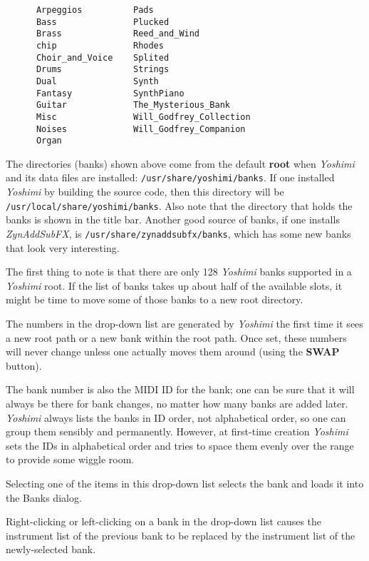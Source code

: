    \begin{verbatim}
      Arpeggios          Pads
      Bass               Plucked
      Brass              Reed_and_Wind
      chip               Rhodes
      Choir_and_Voice    Splited
      Drums              Strings
      Dual               Synth
      Fantasy            SynthPiano
      Guitar             The_Mysterious_Bank
      Misc               Will_Godfrey_Collection
      Noises             Will_Godfrey_Companion
      Organ              
   \end{verbatim}

   The directories (banks) shown above come from the default \textbf{root}
   when \textsl{Yoshimi} and its data files are installed:
   \texttt{/usr/share/yoshimi/banks}.
   If one installed \textsl{Yoshimi} by building the source code, then
   this directory will be
   \texttt{/usr/local/share/yoshimi/banks}.
   Also note that the directory that holds the banks is shown in the title bar.
   Another good source of banks, if one installs \textsl{ZynAddSubFX},
   is \texttt{/usr/share/zynaddsubfx/banks}, which has some new banks that look
   very interesting.

   The first thing to note is that there are only 128 \textsl{Yoshimi} banks
   supported in a \textsl{Yoshimi} root.
   If the list of banks takes up about
   half of the available slots, it might be time to move some of those banks to
   a new root directory.

   The numbers in the drop-down list are generated by \textsl{Yoshimi} the
   first time it sees a new root path or a new bank within the root path.
   Once set, these numbers will never change unless one actually moves them
   around (using the \textbf{SWAP} button).

   The bank number is also the MIDI ID for the bank;
   one can be sure that it will always
   be there for bank changes, no matter how many banks are added later.
   \textsl{Yoshimi} always lists the banks in ID order, not alphabetical
   order, so one can group them sensibly and permanently.
   However, at first-time creation \textsl{Yoshimi} sets the IDs in
   alphabetical order and tries to space them evenly over the range to
   provide some wiggle room.                                        

   Selecting one of the items in this drop-down list selects the bank and
   loads it into the Banks dialog.

   Right-clicking or left-clicking on a bank in the drop-down list
   causes the instrument list of the previous bank to be replaced by the
   instrument list of the newly-selected bank.

